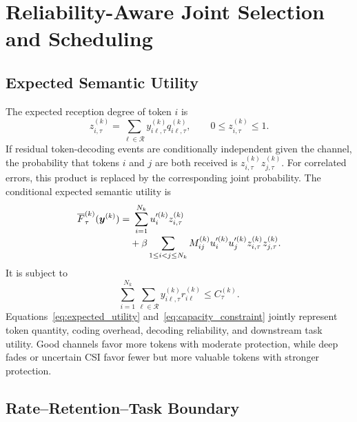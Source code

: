 \documentclass[journal]{IEEEtran}
\begin{document}
\section{Reliability-Aware Joint Selection and Scheduling}
\label{sec:optimization}

\subsection{Expected Semantic Utility}

The expected reception degree of token $i$ is
\begin{equation}
z_{i,\tau}^{(k)}
=\sum_{\ell\in\mathcal R}
y_{i\ell,\tau}^{(k)}q_{i\ell,\tau}^{(k)},
\qquad 0\leq z_{i,\tau}^{(k)}\leq1.
\label{eq:expected_reception}
\end{equation}
If residual token-decoding events are conditionally independent given the channel, the probability that tokens $i$ and $j$ are both received is $z_{i,\tau}^{(k)}z_{j,\tau}^{(k)}$. For correlated errors, this product is replaced by the corresponding joint probability. The conditional expected semantic utility is
\begin{align}
\overline F_{\tau}^{(k)}(\bm y^{(k)})
=&~\sum_{i=1}^{N_k}u_i^{\prime(k)}z_{i,\tau}^{(k)}
\notag\\[-0.2em]
&+\beta\sum_{1\leq i<j\leq N_k}
M_{ij}^{(k)}u_i^{\prime(k)}u_j^{\prime(k)}
z_{i,\tau}^{(k)}z_{j,\tau}^{(k)}.
\label{eq:expected_utility}
\end{align}
It is subject to
\begin{equation}
\sum_{i=1}^{N_k}\sum_{\ell\in\mathcal R}
y_{i\ell,\tau}^{(k)}r_{i\ell}^{(k)}
\leq C_{\tau}^{(k)}.
\label{eq:capacity_constraint}
\end{equation}
Equations~\eqref{eq:expected_utility} and~\eqref{eq:capacity_constraint} jointly represent token quantity, coding overhead, decoding reliability, and downstream task utility. Good channels favor more tokens with moderate protection, while deep fades or uncertain CSI favor fewer but more valuable tokens with stronger protection.

\subsection{Rate--Retention--Task Boundary}
\end{document}
